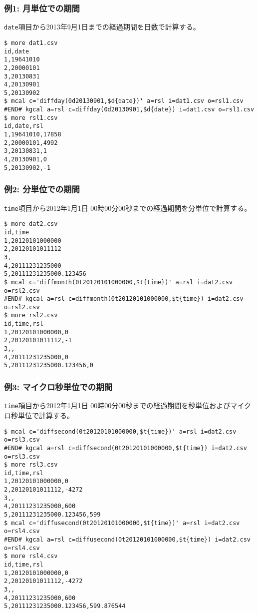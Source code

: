 \subsubsection*{例1: 月単位での期間}

\verb|date|項目から2013年9月1日までの経過期間を日数で計算する。


\begin{Verbatim}[baselinestretch=0.7,frame=single]
$ more dat1.csv
id,date
1,19641010
2,20000101
3,20130831
4,20130901
5,20130902
$ mcal c='diffday(0d20130901,$d{date})' a=rsl i=dat1.csv o=rsl1.csv
#END# kgcal a=rsl c=diffday(0d20130901,$d{date}) i=dat1.csv o=rsl1.csv
$ more rsl1.csv
id,date,rsl
1,19641010,17858
2,20000101,4992
3,20130831,1
4,20130901,0
5,20130902,-1
\end{Verbatim}
\subsubsection*{例2: 分単位での期間}

\verb|time|項目から2012年1月1日 00時00分00秒までの経過期間を分単位で計算する。


\begin{Verbatim}[baselinestretch=0.7,frame=single]
$ more dat2.csv
id,time
1,20120101000000
2,20120101011112
3,
4,20111231235000
5,20111231235000.123456
$ mcal c='diffmonth(0t20120101000000,$t{time})' a=rsl i=dat2.csv o=rsl2.csv
#END# kgcal a=rsl c=diffmonth(0t20120101000000,$t{time}) i=dat2.csv o=rsl2.csv
$ more rsl2.csv
id,time,rsl
1,20120101000000,0
2,20120101011112,-1
3,,
4,20111231235000,0
5,20111231235000.123456,0
\end{Verbatim}
\subsubsection*{例3: マイクロ秒単位での期間}

\verb|time|項目から2012年1月1日 00時00分00秒までの経過期間を秒単位およびマイクロ秒単位で計算する。


\begin{Verbatim}[baselinestretch=0.7,frame=single]
$ mcal c='diffsecond(0t20120101000000,$t{time})' a=rsl i=dat2.csv o=rsl3.csv
#END# kgcal a=rsl c=diffsecond(0t20120101000000,$t{time}) i=dat2.csv o=rsl3.csv
$ more rsl3.csv
id,time,rsl
1,20120101000000,0
2,20120101011112,-4272
3,,
4,20111231235000,600
5,20111231235000.123456,599
$ mcal c='diffusecond(0t20120101000000,$t{time})' a=rsl i=dat2.csv o=rsl4.csv
#END# kgcal a=rsl c=diffusecond(0t20120101000000,$t{time}) i=dat2.csv o=rsl4.csv
$ more rsl4.csv
id,time,rsl
1,20120101000000,0
2,20120101011112,-4272
3,,
4,20111231235000,600
5,20111231235000.123456,599.876544
\end{Verbatim}
